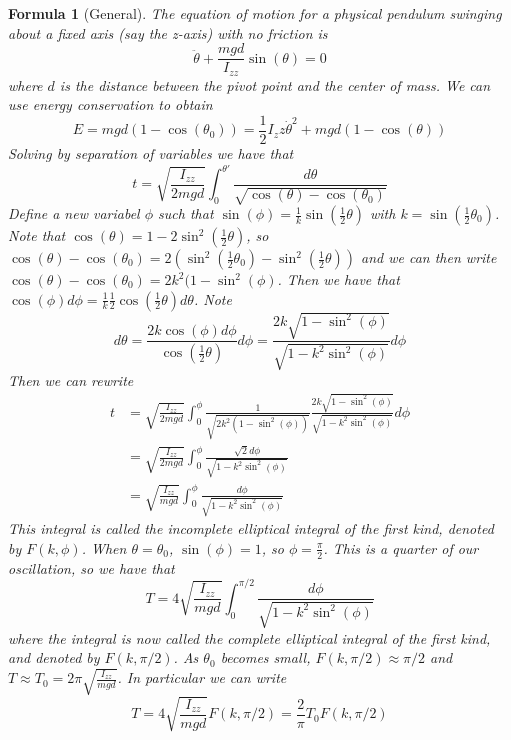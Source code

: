 \documentclass[12pt]{article}
\newtheorem{for}[thm]{Formula}
\theoremstyle{definition}
\theoremstyle{remark}
\numberwithin{equation}{section}
\begin{document}
\begin{for}[General]
        The equation of motion for a physical pendulum swinging about a fixed axis (say the z-axis) with no friction is \begin{equation}
                \ddot{\theta} + \frac{mgd}{I_{zz}}\sin(\theta) = 0
        \end{equation}
        where $d$ is the distance between the pivot point and the center of mass. We can use energy conservation to obtain \begin{equation}
                E = mgd(1-\cos(\theta_0)) = \frac{1}{2}I_zz\dot{\theta}^2+mgd(1-\cos(\theta))
        \end{equation}
        Solving by separation of variables we have that \begin{equation}
                t = \sqrt{\frac{I_{zz}}{2mgd}}\int_0^{\theta'}\frac{d\theta}{\sqrt{\cos(\theta)-\cos(\theta_0)}}
        \end{equation}
        Define a new variabel $\phi$ such that $\sin(\phi) = \frac{1}{k}\sin(\frac{1}{2}\theta)$ with $k = \sin(\frac{1}{2}\theta_0)$. Note that $\cos(\theta) = 1 - 2\sin^2(\frac{1}{2}\theta)$, so $\cos(\theta)-\cos(\theta_0) = 2(\sin^2(\frac{1}{2}\theta_0) - \sin^2(\frac{1}{2}\theta))$ and we can then write $\cos(\theta) - \cos(\theta_0) = 2k^2(1-\sin^2(\phi)$. Then we have that $\cos(\phi)d\phi = \frac{1}{k}\frac{1}{2}\cos(\frac{1}{2}\theta)d\theta$. Note $$d\theta = \frac{2k\cos(\phi)d\phi}{\cos(\frac{1}{2}\theta)}d\phi = \frac{2k\sqrt{1-\sin^2(\phi)}}{\sqrt{1-k^2\sin^2(\phi)}}d\phi$$ Then we can rewrite \begin{align*}
                t &= \sqrt{\frac{I_{zz}}{2mgd}}\int_0^{\phi}\frac{1}{\sqrt{2k^2(1-\sin^2(\phi))}}\frac{2k\sqrt{1-\sin^2(\phi)}}{\sqrt{1-k^2\sin^2(\phi)}}d\phi \\
                &= \sqrt{\frac{I_{zz}}{2mgd}}\int_0^{\phi}\frac{\sqrt{2}d\phi}{\sqrt{1-k^2\sin^2(\phi)}}  \\
                &=\sqrt{\frac{I_{zz}}{mgd}}\int_0^{\phi}\frac{d\phi}{\sqrt{1-k^2\sin^2(\phi)}}
        \end{align*}
        This integral is called the incomplete elliptical integral of the first kind, denoted by $F(k,\phi)$. When $\theta = \theta_0$, $\sin(\phi) = 1$, so $\phi = \frac{\pi}{2}$. This is a quarter of our oscillation, so we have that \begin{equation}
                T = 4\sqrt{\frac{I_{zz}}{mgd}}\int_0^{\pi/2}\frac{d\phi}{\sqrt{1-k^2\sin^2(\phi)}}
        \end{equation}
        where the integral is now called the complete elliptical integral of the first kind, and denoted by $F(k,\pi/2)$. As $\theta_0$ becomes small, $F(k,\pi/2) \approx \pi/2$ and $T \approx T_0 = 2\pi\sqrt{\frac{I_{zz}}{mgd}}$. In particular we can write \begin{equation}
                T = 4\sqrt{\frac{I_{zz}}{mgd}}F(k,\pi/2) = \frac{2}{\pi}T_0F(k,\pi/2)
        \end{equation}
\end{for}
\end{document}
